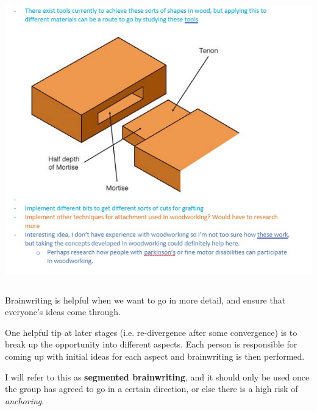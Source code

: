 \documentclass{beamer}
\begin{document}
{\begin{columns}
\begin{column}{0.6\textwidth}
        \includegraphics[width=\linewidth]{handbook/brainwriting.jpg}
    \end{column}
\end{columns}
\newpage
\begin{takeaway}
    Brainwriting is helpful when we want to go in more detail, and ensure that everyone's ideas come through.
\end{takeaway}
One helpful tip at later stages (i.e. re-divergence after some convergence) is to break up the opportunity into different aspects. Each person is responsible for coming up with initial ideas for each aspect and brainwriting is then performed.
\vspace{2mm}

I will refer to this as \textbf{segmented brainwriting}, and it should only be used once the group has agreed to go in a certain direction, or else there is a high risk of \textit{anchoring}.
}
\end{document}
